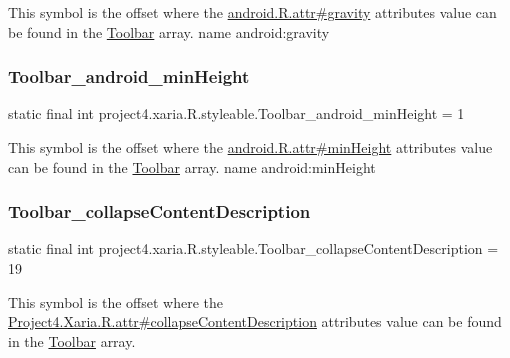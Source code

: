 This symbol is the offset where the \hyperlink{}{android.\+R.\+attr\#gravity} attribute\textquotesingle{}s value can be found in the \hyperlink{classproject4_1_1xaria_1_1R_1_1styleable_af6c30f9e9e086f6bf4e510669443fa59}{Toolbar} array.  name android\+:gravity \mbox{\label{classproject4_1_1xaria_1_1R_1_1styleable_ac5a3d253c3d18c7ab741bcfc47232df4}} 
\subsubsection{\texorpdfstring{Toolbar\+\_\+android\+\_\+min\+Height}{Toolbar\_android\_minHeight}}
{\footnotesize\ttfamily static final int project4.\+xaria.\+R.\+styleable.\+Toolbar\+\_\+android\+\_\+min\+Height = 1\hspace{0.3cm}{\ttfamily [static]}}

This symbol is the offset where the \hyperlink{}{android.\+R.\+attr\#min\+Height} attribute\textquotesingle{}s value can be found in the \hyperlink{classproject4_1_1xaria_1_1R_1_1styleable_af6c30f9e9e086f6bf4e510669443fa59}{Toolbar} array.  name android\+:min\+Height \mbox{\label{classproject4_1_1xaria_1_1R_1_1styleable_a98b1b074efe3a521e01cbddeaaf5da0f}} 
\subsubsection{\texorpdfstring{Toolbar\+\_\+collapse\+Content\+Description}{Toolbar\_collapseContentDescription}}
{\footnotesize\ttfamily static final int project4.\+xaria.\+R.\+styleable.\+Toolbar\+\_\+collapse\+Content\+Description = 19\hspace{0.3cm}{\ttfamily [static]}}

This symbol is the offset where the \hyperlink{}{Project4.\+Xaria.\+R.\+attr\#collapse\+Content\+Description} attribute\textquotesingle{}s value can be found in the \hyperlink{classproject4_1_1xaria_1_1R_1_1styleable_af6c30f9e9e086f6bf4e510669443fa59}{Toolbar} array.


